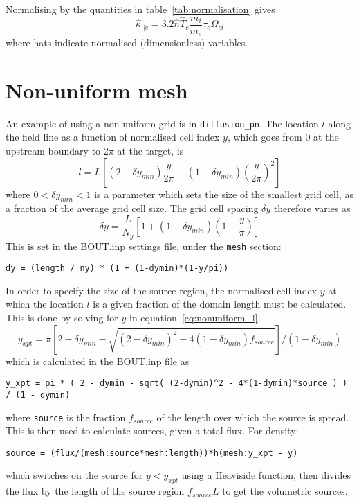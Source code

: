 \documentclass[12pt,a4paper]{article}
\begin{document}
Normalising by the quantities in table~\ref{tab:normalisation} gives
\begin{equation}
\hat{\kappa}_{||e} = 3.2 \hat{n}\hat{T}_e\frac{m_i}{m_e}\tau_e\Omega_{ci}
\end{equation}
where hats indicate normalised (dimensionless) variables. 

\section{Non-uniform mesh}

An example of using a non-uniform grid is in \texttt{diffusion\_pn}.
The location $l$ along the field line as a function of normalised cell index $y$,
which goes from $0$ at the upstream boundary to $2\pi$ at the target, is
\begin{equation}
  l = L\left[ \left(2 - \delta y_{min}\right)\frac{y}{2\pi} -\left(1-\delta y_{min}\right)\left(\frac{y}{2\pi}\right)^2\right]
\label{eq:nonuniform_l}
\end{equation}
where $0<\delta y_{min}<1$ is a parameter which sets the size of the smallest grid cell, as a fraction
of the average grid cell size. The grid cell spacing $\delta y$ therefore varies as 
\begin{equation}
\delta y = \frac{L}{N_y} \left[ 1 + \left(1-\delta y_{min}\right)\left(1-\frac{y}{\pi}\right)\right]
\end{equation}
This is set in the BOUT.inp settings file, under the \texttt{mesh} section:
\begin{verbatim}
dy = (length / ny) * (1 + (1-dymin)*(1-y/pi))
\end{verbatim}
In order to specify the size of the source region, the normalised cell index $y$ at which
the location $l$ is a given fraction of the domain length must be calculated. This is done by
solving for $y$ in equation~\ref{eq:nonuniform_l}.
\begin{equation}
y_{xpt} = \pi\left[2 - \delta y_{min} - \sqrt{\left(2-\delta y_{min}\right)^2 - 4\left(1-\delta y_{min}\right) f_{source}}\right]/\left(1-\delta y_{min}\right)
\end{equation}
which is calculated in the BOUT.inp file as
\begin{verbatim}
y_xpt = pi * ( 2 - dymin - sqrt( (2-dymin)^2 - 4*(1-dymin)*source ) ) / (1 - dymin)
\end{verbatim}
where \texttt{source} is the fraction $f_{source}$ of the length over which the source is spread.
This is then used to calculate sources, given a total flux. For density:
\begin{verbatim}
source = (flux/(mesh:source*mesh:length))*h(mesh:y_xpt - y)
\end{verbatim}
which switches on the source for $y < y_{xpt}$ using a Heaviside function, then divides the flux
by the length of the source region $f_{source}L$ to get the volumetric sources.
\end{document}
